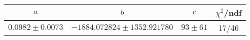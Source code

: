 \begin{tabular}{c|c|c|c}
$a$ & $b$ & $c$ & $\chi^2$/ndf \\
\hline
$0.0982\pm0.0073$ & $-1884.072824\pm1352.921780$ & $93\pm61$ & 17/46
\end{tabular}
